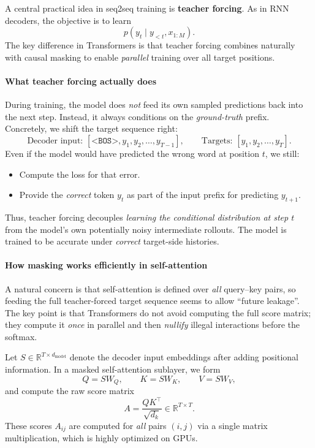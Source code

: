 \noindent
A central practical idea in seq2seq training is \textbf{teacher forcing}.
As in RNN decoders, the objective is to learn
\[
p(y_t \mid y_{<t}, x_{1:M}).
\]
The key difference in Transformers is that teacher forcing combines naturally with causal masking
to enable \emph{parallel} training over all target positions.

\paragraph{What teacher forcing actually does}
\noindent
During training, the model does \emph{not} feed its own sampled predictions back into the next step.
Instead, it always conditions on the \emph{ground-truth} prefix.
Concretely, we shift the target sequence right:
\[
\text{Decoder input: }
[\texttt{<BOS>}, y_1, y_2, \dots, y_{T-1}],
\qquad
\text{Targets: }
[y_1, y_2, \dots, y_T].
\]
Even if the model would have predicted the wrong word at position \(t\),
we still:
\begin{itemize}
	\item Compute the loss for that error.
	\item Provide the \emph{correct} token \(y_t\) as part of the input prefix for predicting \(y_{t+1}\).
\end{itemize}
Thus, teacher forcing decouples \emph{learning the conditional distribution at step \(t\)}
from the model’s own potentially noisy intermediate rollouts.
The model is trained to be accurate under \emph{correct} target-side histories.

\paragraph{How masking works efficiently in self-attention}
\noindent
A natural concern is that self-attention is defined over \emph{all} query--key pairs,
so feeding the full teacher-forced target sequence seems to allow ``future leakage''.
The key point is that Transformers do not avoid computing the full score matrix;
they compute it \emph{once} in parallel and then \emph{nullify} illegal interactions before the softmax.

\noindent
Let \(S \in \mathbb{R}^{T \times d_{\text{model}}}\) denote the decoder input embeddings
after adding positional information.
In a masked self-attention sublayer, we form
\[
Q = S W_Q, 
\qquad
K = S W_K, 
\qquad
V = S W_V,
\]
and compute the raw score matrix
\[
A = \frac{QK^\top}{\sqrt{d_k}}
\in \mathbb{R}^{T \times T}.
\]
These scores \(A_{ij}\) are computed for \emph{all} pairs \((i,j)\) via a single matrix multiplication,
which is highly optimized on GPUs.

